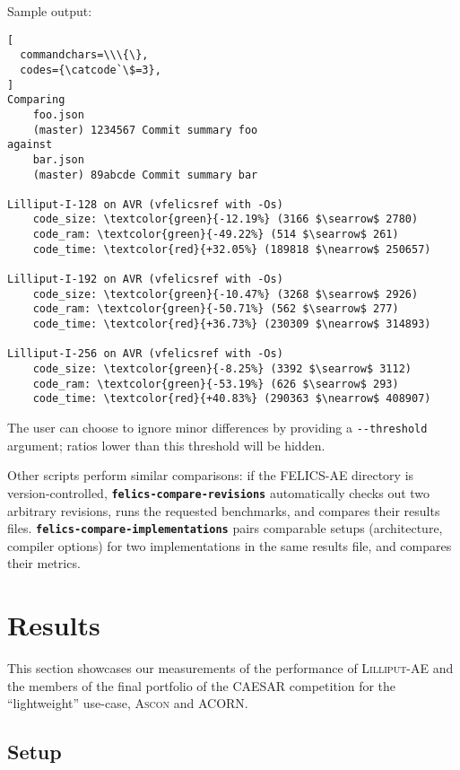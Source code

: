 \documentclass{article}
\begin{document}
Sample output:

\begin{Verbatim}[
  commandchars=\\\{\},
  codes={\catcode`\$=3},
]
Comparing
	foo.json
	(master) 1234567 Commit summary foo
against
	bar.json
	(master) 89abcde Commit summary bar

Lilliput-I-128 on AVR (vfelicsref with -Os)
	code_size: \textcolor{green}{-12.19%} (3166 $\searrow$ 2780)
	code_ram: \textcolor{green}{-49.22%} (514 $\searrow$ 261)
	code_time: \textcolor{red}{+32.05%} (189818 $\nearrow$ 250657)

Lilliput-I-192 on AVR (vfelicsref with -Os)
	code_size: \textcolor{green}{-10.47%} (3268 $\searrow$ 2926)
	code_ram: \textcolor{green}{-50.71%} (562 $\searrow$ 277)
	code_time: \textcolor{red}{+36.73%} (230309 $\nearrow$ 314893)

Lilliput-I-256 on AVR (vfelicsref with -Os)
	code_size: \textcolor{green}{-8.25%} (3392 $\searrow$ 3112)
	code_ram: \textcolor{green}{-53.19%} (626 $\searrow$ 293)
	code_time: \textcolor{red}{+40.83%} (290363 $\nearrow$ 408907)
\end{Verbatim}

The user can choose to ignore minor differences by providing a
\texttt{-{}-threshold} argument; ratios lower than this threshold will
be hidden.

Other scripts perform similar comparisons: if the FELICS-AE directory
is version-controlled, \textbf{\texttt{felics-compare-revisions}}
automatically checks out two arbitrary revisions, runs the requested
benchmarks, and compares their results files.
\textbf{\texttt{felics-compare-implementations}} pairs comparable
setups (architecture, compiler options) for two implementations in the
same results file, and compares their metrics.

\section{Results}
\label{sec:results}

This section showcases our measurements of the performance of
\textsc{Lilliput-AE} and the members of the final portfolio of the
CAESAR competition for the ``lightweight''
use-case\cite{CAESAR:submissions}, \textsc{Ascon} and ACORN.

\subsection{Setup}
\label{sec:results/setup}
\end{document}
